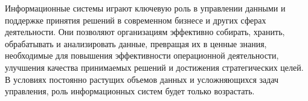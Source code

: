 \documentclass{ou}
\begin{document}
Информационные системы играют ключевую роль в управлении данными и поддержке принятия решений в современном бизнесе и других сферах деятельности. Они позволяют организациям эффективно собирать, хранить, обрабатывать и анализировать данные, превращая их в ценные знания, необходимые для повышения эффективности операционной деятельности, улучшения качества принимаемых решений и достижения стратегических целей. В условиях постоянно растущих объемов данных и усложняющихся задач управления, роль информационных систем будет только возрастать.
\newpage
{
\sloppy
\nocite{*}
\cleardoublepage
{}


}
\end{document}
